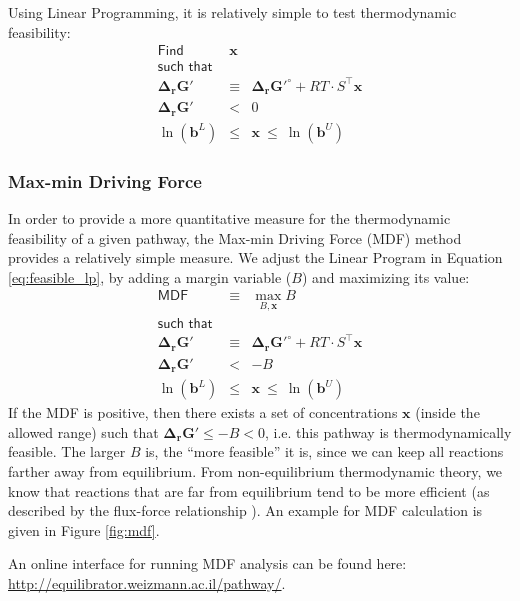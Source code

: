 \documentclass[10pt,a4paper]{article}
\newcommand{\mymatrix}[1]{#1}
\newcommand{\myvector}[1]{{\boldsymbol{#1}}}
\newcommand{\stoichmat}{\mymatrix{S}}
\begin{document}
Using Linear Programming, it is relatively simple to test thermodynamic feasibility:
\begin{eqnarray}\label{eq:feasible_lp}
\textsf{Find}&\myvector{x}&\nonumber\\
\textsf{such that}&&\nonumber\\
\myvector{\Delta_r G'} &\equiv& \myvector{\Delta_r G'^\circ} + RT \cdot \stoichmat^\top \myvector{x} \nonumber\\
\myvector{\Delta_r G'} &<& 0\nonumber\\
\ln(\myvector{b}^L) &\leq& \myvector{x} ~\leq~ \ln(\myvector{b}^U) 
\end{eqnarray}

\subsubsection{Max-min Driving Force}
In order to provide a more quantitative measure for the thermodynamic feasibility of a given pathway, the Max-min Driving Force (MDF) method provides a relatively simple measure. We adjust the Linear Program in Equation \ref{eq:feasible_lp}, by adding a margin variable ($B$) and maximizing its value:
\begin{eqnarray}
\textsf{MDF} &\equiv& \max_{B,\myvector{x}}{B} \nonumber\\
\textsf{such that}&&\nonumber\\
\myvector{\Delta_r G'} &\equiv& \myvector{\Delta_r G'^\circ} + RT \cdot \stoichmat^\top \myvector{x} \nonumber\\
\myvector{\Delta_r G'} &<& -B\nonumber\\
\ln(\myvector{b}^L) &\leq& \myvector{x} ~\leq~ \ln(\myvector{b}^U) 
\end{eqnarray}
If the MDF is positive, then there exists a set of concentrations $\myvector{x}$ (inside the allowed range) such that $\myvector{\Delta_r G'} \leq -B < 0$, i.e. this pathway is thermodynamically feasible. The larger $B$ is, the ``more feasible'' it is, since we can keep all reactions farther away from equilibrium. From non-equilibrium thermodynamic theory, we know that reactions that are far from equilibrium tend to be more efficient (as described by the flux-force relationship \cite{beard_relationship_2007-1}). An example for MDF calculation is given in Figure \ref{fig:mdf}.

An online interface for running MDF analysis can be found here: \url{http://equilibrator.weizmann.ac.il/pathway/}.
\end{document}
